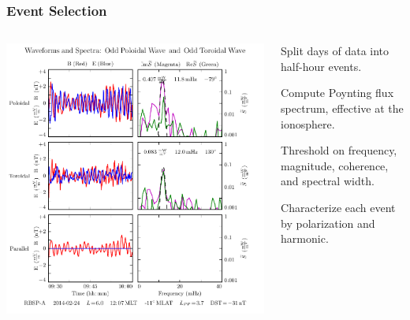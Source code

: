 \documentclass{beamer}
\begin{document}
\begin{frame}
\frametitle{Event Selection}

\begin{columns}
\includegraphics[width=\textwidth]{figures/sample_event_phase.pdf}
\begin{wideitemize}
\item Split  days of data into half-hour events. 
\item Compute Poynting flux spectrum, effective at the ionosphere. 
\item Threshold on frequency, magnitude, coherence, and spectral width. 
\item Characterize each event by polarization and harmonic. 
\end{wideitemize}
\end{columns}

\end{frame}

\end{document}
